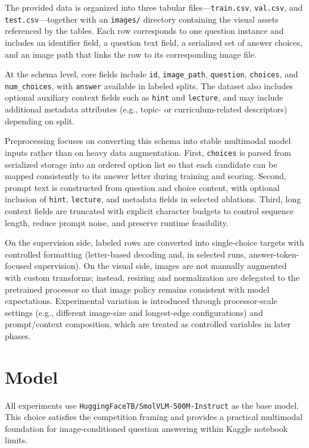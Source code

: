 \documentclass[11pt]{article}
\begin{document}
The provided data is organized into three tabular files---\texttt{train.csv}, \texttt{val.csv}, and \texttt{test.csv}---together with an \texttt{images/} directory containing the visual assets referenced by the tables. Each row corresponds to one question instance and includes an identifier field, a question text field, a serialized set of answer choices, and an image path that links the row to its corresponding image file.

At the schema level, core fields include \texttt{id}, \texttt{image\_path}, \texttt{question}, \texttt{choices}, and \texttt{num\_choices}, with \texttt{answer} available in labeled splits. The dataset also includes optional auxiliary context fields such as \texttt{hint} and \texttt{lecture}, and may include additional metadata attributes (e.g., topic- or curriculum-related descriptors) depending on split.

Preprocessing focuses on converting this schema into stable multimodal model inputs rather than on heavy data augmentation. First, \texttt{choices} is parsed from serialized storage into an ordered option list so that each candidate can be mapped consistently to its answer letter during training and scoring. Second, prompt text is constructed from question and choice content, with optional inclusion of \texttt{hint}, \texttt{lecture}, and metadata fields in selected ablations. Third, long context fields are truncated with explicit character budgets to control sequence length, reduce prompt noise, and preserve runtime feasibility.

On the supervision side, labeled rows are converted into single-choice targets with controlled formatting (letter-based decoding and, in selected runs, answer-token-focused supervision). On the visual side, images are not manually augmented with custom transforms; instead, resizing and normalization are delegated to the pretrained processor so that image policy remains consistent with model expectations. Experimental variation is introduced through processor-scale settings (e.g., different image-size and longest-edge configurations) and prompt/context composition, which are treated as controlled variables in later phases.

\section{Model}
All experiments use \texttt{HuggingFaceTB/SmolVLM-500M-Instruct} as the base model. This choice satisfies the competition framing and provides a practical multimodal foundation for image-conditioned question answering within Kaggle notebook limits.
\end{document}
